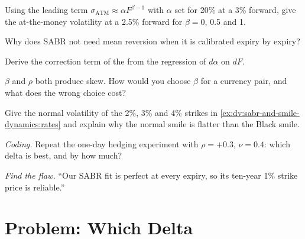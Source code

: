 \begin{exercise}[$\star$]\label{exo:dv:sabr-and-smile-dynamics:2}
Using the leading term $\sigma_{\mathrm{ATM}}\approx\alpha F^{\beta-1}$ with $\alpha$ set for 20\% at a 3\% forward, give
the at-the-money volatility at a 2.5\% forward for $\beta=0$, 0.5 and 1.
\end{exercise}

\begin{exercise}[$\star$]\label{exo:dv:sabr-and-smile-dynamics:3}
Why does SABR not need mean reversion when it is calibrated expiry by expiry?
\end{exercise}

\begin{exercise}[$\star\star$]\label{exo:dv:sabr-and-smile-dynamics:4}
Derive the correction term of the  from the regression of $d\alpha$ on $dF$.
\end{exercise}

\begin{exercise}[$\star\star$]\label{exo:dv:sabr-and-smile-dynamics:5}
$\beta$ and $\rho$ both produce skew. How would you choose $\beta$ for a currency pair, and what does the wrong choice
cost?
\end{exercise}

\begin{exercise}[$\star\star$]\label{exo:dv:sabr-and-smile-dynamics:6}
Give the normal volatility of the 2\%, 3\% and 4\% strikes in \cref{ex:dv:sabr-and-smile-dynamics:rates} and explain why
the normal smile is flatter than the Black smile.
\end{exercise}

\begin{exercise}[$\star\star\star$]\label{exo:dv:sabr-and-smile-dynamics:7}
\emph{Coding.} Repeat the one-day hedging experiment with $\rho=+0.3$, $\nu=0.4$: which delta is best, and by how much?
\end{exercise}

\begin{exercise}[$\star\star\star$]\label{exo:dv:sabr-and-smile-dynamics:8}
\emph{Find the flaw.} ``Our SABR fit is perfect at every expiry, so its ten-year 1\% strike price is reliable.''
\end{exercise}

\section{Problem: Which Delta}

